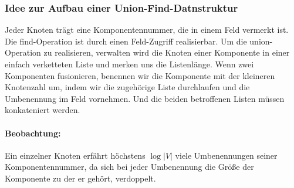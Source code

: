 \subsubsection{Idee zur Aufbau einer Union-Find-Datnstruktur}
Jeder Knoten trägt eine Komponentennummer, die in einem Feld vermerkt ist. Die find-Operation ist durch einen Feld-Zugriff realisierbar. Um die union-Operation zu realisieren, verwalten wird die Knoten einer Komponente in einer einfach verketteten Liste und merken uns die Listenlänge. Wenn zwei Komponenten fusionieren, benennen wir die Komponente mit der kleineren Knotenzahl um, indem wir die zugehörige Liste durchlaufen und die Umbenennung im Feld vornehmen. Und die beiden betroffenen Listen müssen konkateniert werden.
\paragraph{Beobachtung:} Ein einzelner Knoten erfährt höchstens $\log|V|$ viele Umbenennungen seiner Komponentennummer, da sich bei jeder Umbenennung die Größe der Komponente zu der er gehört, verdoppelt.